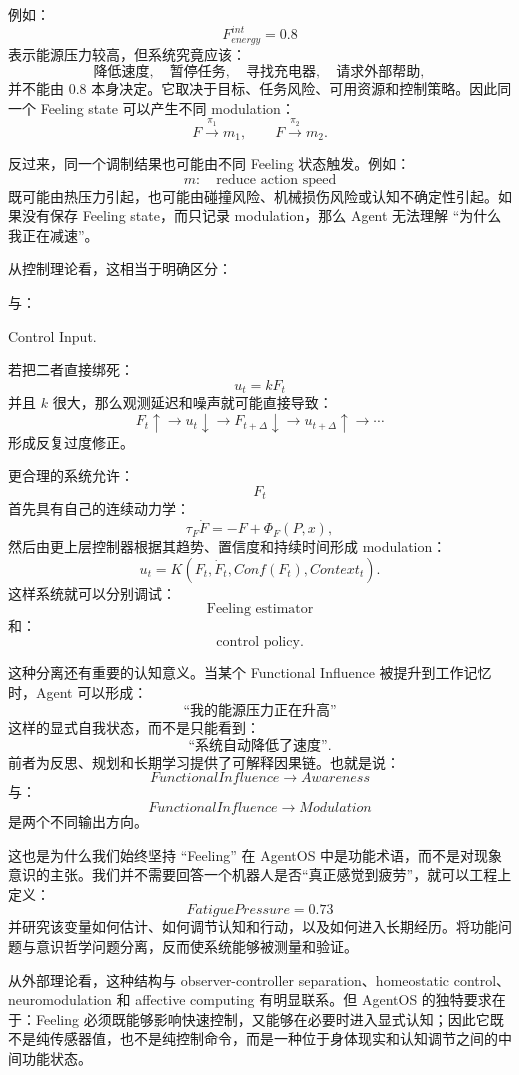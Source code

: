 例如：
\[
F^{int}_{energy}=0.8
\]
表示能源压力较高，但系统究竟应该：
\[
\text{降低速度},
\quad
\text{暂停任务},
\quad
\text{寻找充电器},
\quad
\text{请求外部帮助},
\]
并不能由 $0.8$ 本身决定。它取决于目标、任务风险、可用资源和控制策略。因此同一个 Feeling state 可以产生不同 modulation：
\[
F
\overset{\pi_1}{\longrightarrow}
m_1,
\qquad
F
\overset{\pi_2}{\longrightarrow}
m_2.
\]

反过来，同一个调制结果也可能由不同 Feeling 状态触发。例如：
\[
m:
\quad
\text{reduce action speed}
\]
既可能由热压力引起，也可能由碰撞风险、机械损伤风险或认知不确定性引起。如果没有保存 Feeling state，而只记录 modulation，那么 Agent 无法理解 ``为什么我正在减速''。

从控制理论看，这相当于明确区分：
\begin{statementbox}
\centering
{}
\end{statementbox}
与：
\begin{statementbox}
Control Input.
\end{statementbox}
若把二者直接绑死：
\[
u_t=kF_t
\]
并且 $k$ 很大，那么观测延迟和噪声就可能直接导致：
\[
F_t\uparrow
\rightarrow
u_t\downarrow
\rightarrow
F_{t+\Delta}\downarrow
\rightarrow
u_{t+\Delta}\uparrow
\rightarrow\cdots
\]
形成反复过度修正。

更合理的系统允许：
\[
F_t
\]
首先具有自己的连续动力学：
\[
\tau_F\dot F
=
-F+\Phi_F(P,x),
\]
然后由更上层控制器根据其趋势、置信度和持续时间形成 modulation：
\[
u_t
=
K(
F_t,
\dot F_t,
Conf(F_t),
Context_t
).
\]
这样系统就可以分别调试：
\[
\text{Feeling estimator}
\]
和：
\[
\text{control policy}.
\]

这种分离还有重要的认知意义。当某个 Functional Influence 被提升到工作记忆时，Agent 可以形成：
\[
\text{``我的能源压力正在升高''}
\]
这样的显式自我状态，而不是只能看到：
\[
\text{``系统自动降低了速度''}.
\]
前者为反思、规划和长期学习提供了可解释因果链。也就是说：
\[
FunctionalInfluence
\rightarrow
Awareness
\]
与：
\[
FunctionalInfluence
\rightarrow
Modulation
\]
是两个不同输出方向。

这也是为什么我们始终坚持 ``Feeling'' 在 AgentOS 中是功能术语，而不是对现象意识的主张。我们并不需要回答一个机器人是否``真正感觉到疲劳''，就可以工程上定义：
\[
FatiguePressure=0.73
\]
并研究该变量如何估计、如何调节认知和行动，以及如何进入长期经历。将功能问题与意识哲学问题分离，反而使系统能够被测量和验证。

从外部理论看，这种结构与 observer-controller separation、homeostatic control、neuromodulation 和 affective computing 有明显联系。但 AgentOS 的独特要求在于：Feeling 必须既能够影响快速控制，又能够在必要时进入显式认知；因此它既不是纯传感器值，也不是纯控制命令，而是一种位于身体现实和认知调节之间的中间功能状态。

